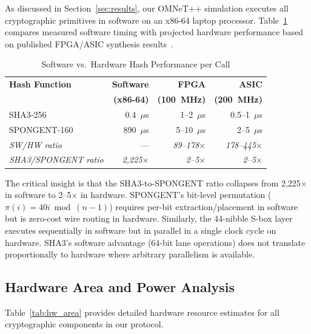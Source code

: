\documentclass[11pt,a4paper]{article}
\begin{document}
As discussed in Section~\ref{sec:results}, our OMNeT++ simulation executes all cryptographic primitives in software on an x86-64 laptop processor. Table~\ref{tab:hw_vs_sw} compares measured software timing with projected hardware performance based on published FPGA/ASIC synthesis results~\cite{spongent_original, lightweight_crypto_evaluation}.

\begin{table}[H]
\centering
\caption{Software vs.\ Hardware Hash Performance per Call}
\label{tab:hw_vs_sw}
\begin{tabular}{@{}lrrr@{}}
\toprule
\textbf{Hash Function} & \textbf{Software} & \textbf{FPGA} & \textbf{ASIC} \\
& \textbf{(x86-64)} & \textbf{(100~MHz)} & \textbf{(200~MHz)} \\
\midrule
SHA3-256 & 0.4~$\mu$s & 1--2~$\mu$s & 0.5--1~$\mu$s \\
SPONGENT-160 & 890~$\mu$s & 5--10~$\mu$s & 2--5~$\mu$s \\
\midrule
\textit{SW/HW ratio} & --- & \textit{89--178$\times$} & \textit{178--445$\times$} \\
\textit{SHA3/SPONGENT ratio} & \textit{2,225$\times$} & \textit{2--5$\times$} & \textit{2--5$\times$} \\
\bottomrule
\end{tabular}
\end{table}

The critical insight is that the SHA3-to-SPONGENT ratio collapses from 2,225$\times$ in software to 2--5$\times$ in hardware. SPONGENT's bit-level permutation ($\pi(i) = 40i \bmod (n-1)$) requires per-bit extraction/placement in software but is zero-cost wire routing in hardware. Similarly, the 44-nibble S-box layer executes sequentially in software but in parallel in a single clock cycle on hardware. SHA3's software advantage (64-bit lane operations) does not translate proportionally to hardware where arbitrary parallelism is available.

\subsection{Hardware Area and Power Analysis}

Table~\ref{tab:hw_area} provides detailed hardware resource estimates for all cryptographic components in our protocol.
\end{document}
